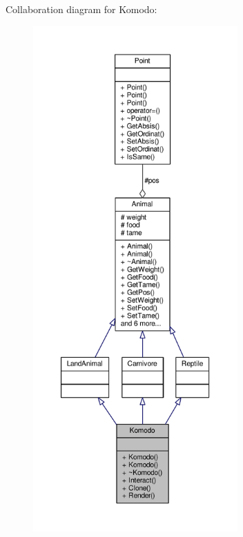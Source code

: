 Collaboration diagram for Komodo\+:
\nopagebreak
\begin{figure}[H]
\begin{center}
\leavevmode
\includegraphics[height=550pt]{classKomodo__coll__graph}
\end{center}
\end{figure}

